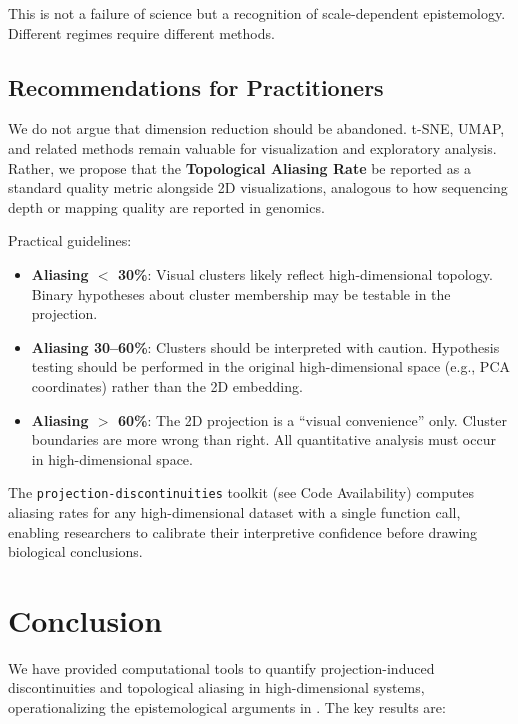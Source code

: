 \documentclass[12pt]{article}
\begin{document}
This is not a failure of science but a recognition of scale-dependent epistemology. Different regimes require different methods.

\subsection{Recommendations for Practitioners}

We do not argue that dimension reduction should be abandoned. t-SNE, UMAP, and related methods remain valuable for visualization and exploratory analysis. Rather, we propose that the \textbf{Topological Aliasing Rate} be reported as a standard quality metric alongside 2D visualizations, analogous to how sequencing depth or mapping quality are reported in genomics.

Practical guidelines:
\begin{itemize}
    \item \textbf{Aliasing $<$ 30\%}: Visual clusters likely reflect high-dimensional topology. Binary hypotheses about cluster membership may be testable in the projection.
    \item \textbf{Aliasing 30--60\%}: Clusters should be interpreted with caution. Hypothesis testing should be performed in the original high-dimensional space (e.g., PCA coordinates) rather than the 2D embedding.
    \item \textbf{Aliasing $>$ 60\%}: The 2D projection is a ``visual convenience'' only. Cluster boundaries are more wrong than right. All quantitative analysis must occur in high-dimensional space.
\end{itemize}

The \texttt{projection-discontinuities} toolkit (see Code Availability) computes aliasing rates for any high-dimensional dataset with a single function call, enabling researchers to calibrate their interpretive confidence before drawing biological conclusions.

\section{Conclusion}

We have provided computational tools to quantify projection-induced discontinuities and topological aliasing in high-dimensional systems, operationalizing the epistemological arguments in \cite{todd2025limits}. The key results are:
\end{document}

